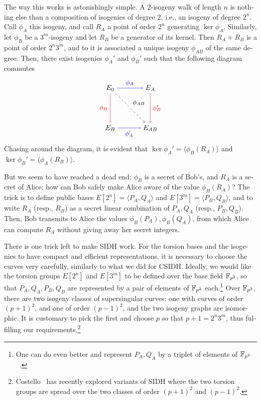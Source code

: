 \begin{otherlanguage}{english}
The way this works is astonishingly simple. A $2$-isogeny walk of
length $n$ is nothing else than a composition of isogenies of degree
$2$, i.e., an isogeny of degree $2^n$. Call $\phi_A$ this isogeny, and
call $R_A$ a point of order $2^n$ generating $\ker\phi_A$. Similarly,
let $\phi_B$ be a $3^m$-isogeny and let $R_B$ be a generator of its
kernel. Then $R_A+R_B$ is a point of order $2^n3^m$, and to it is
associated a unique isogeny $\phi_{AB}$ of the same degree. Then,
there exist isogenies $\phi_A'$ and $\phi_B'$ such that the following
diagram commutes
\begin{equation}
  \label{eq:sidh}
  \begin{tikzpicture}[scale=2,baseline=-1cm]
    \node (E0)  at (0,0) {\(E_0\)};
    \node (EA)  at (1,0) {\(E_A\)};
    \node (EB)  at (0,-1) {\(E_B\)};
    \node (EAB) at (1,-1) {\(E_{AB}\)};
    \draw[->,font=\small]
    (E0) edge[blue] node[auto] {\(\phi_A\)} (EA)
         edge[red] node[auto,swap] {\(\phi_B\)}  (EB)
         edge[dashed] node[auto] {\(\phi_{AB}\)}  (EAB)
    (EA) edge[red] node[auto] {\(\phi_B'\)}  (EAB)
    (EB) edge[blue] node[auto,swap] {\(\phi_A'\)}  (EAB);
  \end{tikzpicture}
\end{equation}
Chasing around the diagram, it is evident that
$\ker\phi_A' = \langle\phi_B(R_A)\rangle$ and
$\ker\phi_B' = \langle\phi_A(R_B)\rangle$.

But we seem to have reached a dead end: $\phi_B$ is a secret of Bob's,
and $R_A$ is a secret of Alice; how can Bob safely make Alice aware of
the value $\phi_B(R_A)$? The trick is to define public bases
$E[2^n]=\langle P_A,Q_A\rangle$ and $E[3^m]=\langle P_B,Q_B\rangle$,
and to write $R_A$ (resp., $R_B$) as a secret linear combination of
$P_A,Q_A$ (resp., $P_B,Q_B$). Then, Bob transmits to Alice the values
$\phi_B(P_A),\phi_B(Q_A)$, from which Alice can compute $R_A$ without
giving away her secret integers.

There is one trick left to make SIDH work. For the torsion bases and
the isogenies to have compact and efficient representations, it is
necessary to choose the curves very carefully, similarly to what we
did for CSIDH.  Ideally, we would like the torsion groups $E[2^n]$ and
$E[3^m]$ to be defined over the base field $\mathbb{F}_{p^2}$, so that
$P_A,Q_A,P_B,Q_B$ are represented by a pair of elements of $\mathbb{F}_{p^2}$
each.\footnote{One can do even better and represent $P_A,Q_A$ by a
  triplet of elements of $\mathbb{F}_{p^2}$~\cite{C:CosLonNae16}.} Over
$\mathbb{F}_{p^2}$, there are two isogeny classes of supersingular curves: one
with curves of order $(p+1)^2$, and one of order $(p-1)^2$, and the
two isogeny graphs are isomorphic. It is customary to pick the first
and choose $p$ so that $p+1=2^n3^m$, thus fulfilling our
requirements.\footnote{Costello~\cite{cryptoeprint:2019:1145} has
  recently explored variants of SIDH where the two torsion groups are
  spread over the two classes of order $(p+1)^2$ and $(p-1)^2$.}


\end{otherlanguage}
